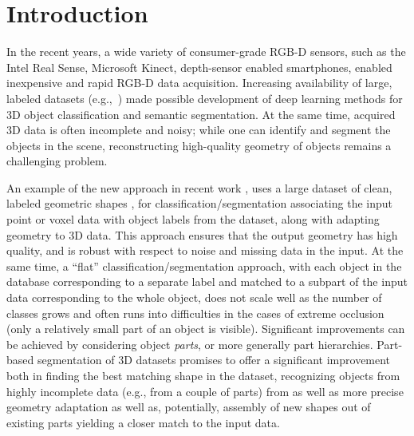 \section{Introduction}

In the recent years, a wide variety of consumer-grade RGB-D sensors, such as the Intel Real Sense, Microsoft Kinect, depth-sensor enabled smartphones, enabled inexpensive and rapid RGB-D data acquisition. Increasing availability of large, labeled datasets (e.g.,~\cite{chang2017matterport3d,dai2017scannet})  made possible development of deep learning methods for 3D object classification and semantic segmentation. At the same time, acquired 3D data is often incomplete and noisy; while one can identify and segment the objects in the scene, reconstructing high-quality geometry of objects remains a challenging problem.  

An example of the new approach in recent work 
\cite{avetisyan2019scan2cad}, uses a large dataset of clean, labeled geometric shapes
\cite{chang2015shapenet}, for classification/segmentation associating the input point or voxel data with object labels from the dataset, along with adapting geometry to 3D data.  This approach ensures that the output geometry has high quality, and is robust with respect to noise and missing data in the input.  
At the same time, a ``flat'' classification/segmentation approach, with each object in the database corresponding to a separate label and matched to a subpart of the input data corresponding to the whole object, does not scale well as the number of classes grows and often runs into difficulties in the cases of extreme occlusion (only a relatively small part of an object is visible). 
Significant improvements can be achieved by considering object \emph{parts}, or more generally part hierarchies. 
Part-based segmentation of 3D datasets promises to offer a significant improvement both in finding the best matching shape in the dataset, recognizing objects from  highly incomplete data (e.g., from a couple of parts) from  as well as more precise geometry adaptation as well as, potentially, assembly of new shapes out of existing parts yielding a closer match to the input data. 



